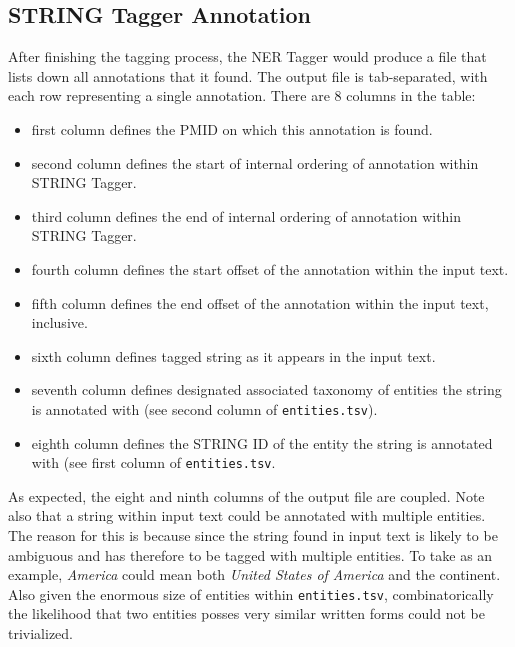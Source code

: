 \subsection{STRING Tagger Annotation}

After finishing the tagging process, the NER Tagger would produce a file that lists down all annotations that it found. The output file is tab-separated, with each row representing a single annotation. There are 8 columns in the table:

\begin{itemize}
\item first column defines the PMID on which this annotation is found.
\item second column defines the start of internal ordering of annotation within STRING Tagger.
\item third column defines the end of internal ordering of annotation within STRING Tagger.
\item fourth column defines the start offset of the annotation within the input text.
\item fifth column defines the end offset of the annotation within the input text, inclusive.
\item sixth column defines tagged string as it appears in the input text.
\item seventh column defines designated associated taxonomy of entities the string is annotated with (see second column of \texttt{entities.tsv}).
\item eighth column defines the STRING ID of the entity the string is annotated with (see first column of \texttt{entities.tsv}.
\end{itemize}

As expected, the eight and ninth columns of the output file are coupled. Note also that a string within input text could be annotated with multiple entities. The reason for this is because since the string found in input text is likely to be ambiguous and has therefore to be tagged with multiple entities. To take as an example, \textit{America} could mean both \textit{United States of America} and the continent. Also given the enormous size of entities within \texttt{entities.tsv}, combinatorically the likelihood that two entities posses very similar written forms could not be trivialized.


